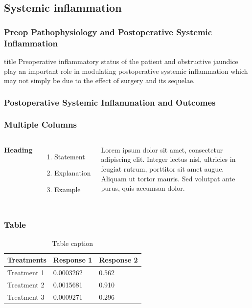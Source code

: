 \documentclass{beamer}
\begin{document}
\subsection{Systemic inflammation}

\begin{frame}
	\frametitle{Preop Pathophysiology and Postoperative Systemic Inflammation}
	\begin{block}{title}
		Preoperative inflammatory status of the patient and obstructive jaundice play an important role in modulating postoperative systemic inflammation which may not simply be due to the effect of surgery and its sequelae.
	\end{block}
\end{frame}

\begin{frame}
	\frametitle{Postoperative Systemic Inflammation and Outcomes}
\end{frame}




\begin{frame}
\frametitle{Multiple Columns}
\begin{columns}[c] %

\textbf{Heading}
\begin{enumerate}
\item Statement
\item Explanation
\item Example
\end{enumerate}

Lorem ipsum dolor sit amet, consectetur adipiscing elit. Integer lectus nisl, ultricies in feugiat rutrum, porttitor sit amet augue. Aliquam ut tortor mauris. Sed volutpat ante purus, quis accumsan dolor.

\end{columns}
\end{frame}

\begin{frame}
\frametitle{Table}
\begin{table}
\begin{tabular}{l l l}
\toprule
\textbf{Treatments} & \textbf{Response 1} & \textbf{Response 2}\\
\midrule
Treatment 1 & 0.0003262 & 0.562 \\
Treatment 2 & 0.0015681 & 0.910 \\
Treatment 3 & 0.0009271 & 0.296 \\
\bottomrule
\end{tabular}
\caption{Table caption}
\end{table}
\end{frame}
\end{document}
